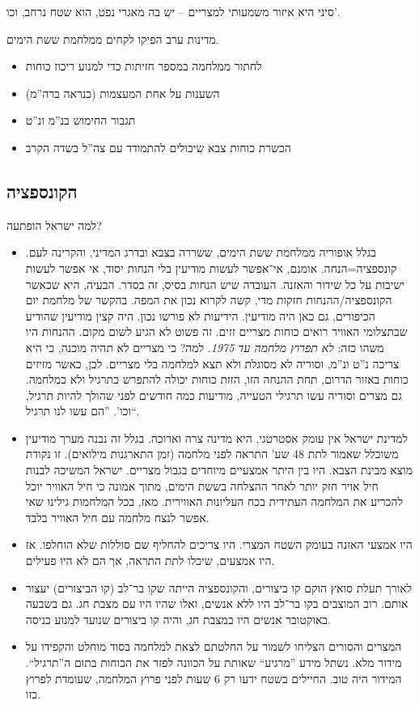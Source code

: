 \documentclass[]{../../../../tex/classes/styledArticle}
\begin{document}
	סיני היא איזור משמעותי למצריים – יש בה מאגרי נפט, הוא שטח נרחב, וכו'. 
	
	מדינות ערב הפיקו לקחים ממלחמת ששת הימים. 
	\begin{itemize}
		\item לחתור ממלחמה במספר חזיתות כדי למנוע ריכוז כוחות
		\item השענות על אחת המעצמות (כנראה ברה''מ)
		\item תגבור החימוש בנ''מ ונ''ט
		\item הכשרת כוחות צבא שיכולים להתמודד עם צה''ל בשדה הקרב
	\end{itemize}
	
	\subsection*{הקונספציה}
	
	למה ישראל הופתעה? 
	
	\begin{itemize}
		\item בגלל אופוריה ממלחמת ששת הימים, ששררה בצבא ובדרג המדיני, והקרינה לעם. קונספציה=הנחה. אומנם, אי־אפשר לעשות מודיעין בלי הנחות יסוד, אי אפשר לעשות ישיבות על כל שידור והאזנה. העובדה שיש הנחות בסיס, זה בסדר. הבעיה, היא שכאשר הקונספציה/ההנחות חזקות מדי, קשה לקרוא נכון את המפה. בהקשר של מלחמת יום הכיפורים, גם כאן היה מודיעין. הידיעות לא פורשו נכון. היה קצין מודיעין שהודיע שבתצלומי האוויר רואים כוחות מצריים זזים. זה פשוט לא הגיע לשום מקום. ההנחות היו משהו כזה: \textit{לא תפרוץ מלחמה עד 1975}. למה? כי מצריים לא תהיה מוכנה, כי היא צריכה נ''ט ונ''מ, וסוריה לא מסוגלת ולא תצא למלחמה בלי מצריים. לכן, כאשר מזיזים כוחות באזור הדרום, תחת ההנחה הזו, הזזת כוחות יכולה להתפרש כתרגיל ולא כמלחמה. גם מצרים וסוריה עשו תרגילי הטעייה, מודיעות כמה חודשים לפני שהולך להיות תרגיל, וכו'. ''הם עשו לנו תרגיל``. 
		
		\item למדינת ישראל אין עומק אסטרטגי, היא מדינה צרה וארוכה. בגלל זה נבנה מערך מודיעין משוכלל שאמור לתת 48 שע' התראה לפני מלחמה (זמן התארגנות מילואים). זו נקודת מוצא מבינת הצבא. היו בין היתר אמצעיים מיוחדים בגבול מצריים. ישראל המשיכה לבנות חיל אויר חזק יותר לאחר ההצלחה בששת הימים, מתוך אמונה כי חיל האוויר יוכל להכריע את המלחמה העתידית בכח העליונות האווירית. מאז, בכל המלחמות גילינו שאי אפשר לנצח מלחמה עם חיל האוויר בלבד. 
		
		\item היו אמצעי האזנה בעומק השטח המצרי. היו צריכים להחליף שם סוללות שלא הוחלפו. אז היו אמצעים, שיכלו לתת התראה, אך הם לא היו פעילים. 
		
		\item לאורך תעלת סואץ הוקם קו ביצורים, והקונספציה הייתה שקו בר־לב (קו הביצורים) יעצור אותם. רוב המוצבים בקו בר־לב היו ללא אנשים, ואלו שהיו היו עם מצבת חג. גם בשבעה באוקטובר אנשים היו במצבת חג, והיה קו ביצורים שנועד למנוע כניסה. 
		
		\item המצרים והסורים הצליחו לשמור על החלטתם לצאת למלחמה בסוד מוחלט והקפידו על מידור מלא. נשתל מידע ''מרגיע`` שאותת על הכוונה לפזר את הכוחות בתום ה''תרגיל``. המידור היה טוב. החיילים בשטח ידעו רק 6 שעות לפני פרוץ המלחמה, שעומדת לפרוץ כזו. 
	\end{itemize}
	
\end{document}
